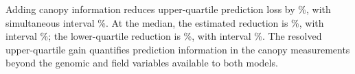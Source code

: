 Adding canopy information reduces upper-quartile prediction loss by
\SoyGenomicUpperGain{}\%, with simultaneous interval
\SoyGenomicUpperGainInterval{}\%. At the median, the estimated
reduction is \SoyGenomicMedianGain{}\%, with interval
\SoyGenomicMedianGainInterval{}\%; the lower-quartile reduction is
\SoyGenomicLowerGain{}\%, with interval
\SoyGenomicLowerGainInterval{}\%. The resolved upper-quartile gain
quantifies prediction information in the canopy measurements beyond
the genomic and field variables available to both models.
